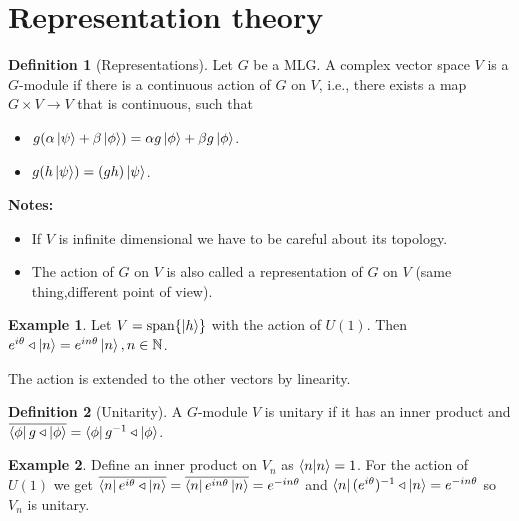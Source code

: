 \documentclass{book}
\theoremstyle{definition}
\newtheorem{defn}{Definition}[section]
\newtheorem{exmp}{Example}[section]
\newcommand{\al}{\alpha}
\begin{document}
\newpage
\section{Representation theory}


\begin{defn}[Representations]
	Let $G$ be a MLG. A complex vector space $V$ is a $G$-module if there is a continuous action of $G$ on $V$, i.e., there exists a map $G\times V  \to V$ that is continuous, such that
	\begin{itemize}
		\item $g(\al\ket{\psi} + \beta\ket{\phi}) =  \al g\ket{\phi} + \beta g\ket{\phi}$.
		
		
		\item $g(h\ket{\psi}) = (gh)\ket{\psi}$. 
	\end{itemize}
\end{defn}

\textbf{Notes:}
\begin{itemize}
	\item If $V$ is infinite dimensional we have to be careful about its topology.
	
	\item The action of $G$ on $V$ is also called a representation of $G$ on $V$ (same thing,different point of view).
\end{itemize}




\begin{exmp}
	Let $V = \text{span}\{ \ket{h} \}$ with the action of $U(1)$. Then $e^{i\theta} \triangleleft \ket{n} = e^{in\theta}\ket{n}, n\in \mathbb{N} $.  
\end{exmp}

The action is extended to the other vectors by linearity. 




\begin{defn}[Unitarity]
	A $G$-module $V$ is unitary if it has an inner product and $\overline{\bra{\phi}g \triangleleft \ket{\phi}} = \bra{\phi}g^{-1} \triangleleft\ket{\phi}$.  
\end{defn}

\begin{exmp}
	Define an inner product on $V_n$ as $\braket{n} = 1$. For the action of $U(1)$ we get $\overline{\bra{n} e^{i\theta}\triangleleft \ket{n}} = \overline{\bra{n} e^{in\theta}\ket{n}} = e^{-in\theta}$ and  ${\bra{n} (e^{i\theta})^{-1}\triangleleft \ket{n}} = e^{-in\theta}$ so $V_n$ is unitary. 
\end{exmp}
\end{document}
